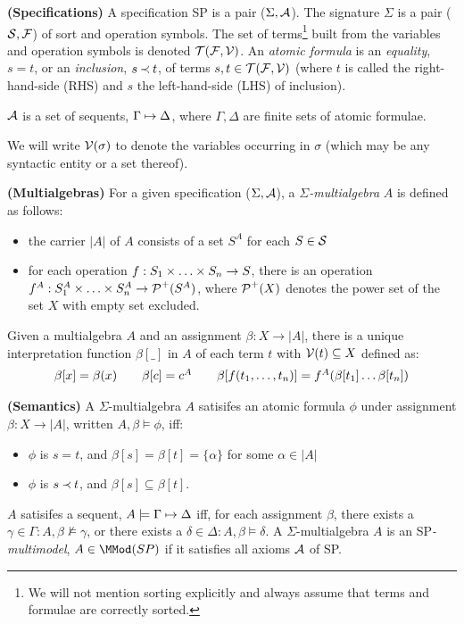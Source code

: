 \begin{DEFINITION} {\bf (Specifications)} \label{de:terms-vars-forms}
A specification SP is a pair ($\Sigma,\Ax$). The signature $\Sigma$ is a pair
($\Sorts,\Funcs$) of sort and operation symbols. 
The set of terms\footnote{We will not mention sorting explicitly
and always assume that terms and formulae are correctly sorted.}
 built from the variables and
operation symbols is denoted $\Terms{\Funcs,\C V}$. An {\em atomic formula} 
is an {\em equality}, $s=t$, or an {\em inclusion}, $s\Incl t$, of terms
$s,t\in\Terms{\Funcs,\Vars}$ (where $t$ is called the 
right-hand-side (RHS) and $s$ the left-hand-side (LHS) of inclusion).

 $\Ax$ is a set of sequents, $\Gamma\Seq\Delta$, where $\Gamma, \Delta$ are
finite sets of atomic formulae.
\end{DEFINITION}
\noindent
We will write $\C V(\sigma)$ to denote the variables occurring in $\sigma$ 
(which may be any syntactic entity or a set thereof).
%
\begin{DEFINITION} {\bf (Multialgebras)} \label{de:multialgebras}
For a given specification ($\Sigma,\Spec$), a {\em $\Sigma$-multialgebra} $A$
is defined as follows:
\begin{itemize}\MyLPar
\item  the carrier $|A|$ of $A$ consists of a set $S^A$ for each $S\in\Sorts$
\item for each operation $f: \List Sn\times \rightarrow S$, there is an operation
$f^A: \List {S^A}n\times \rightarrow \C P^+(S^A)$, where $\C P^+(X)$ denotes the 
power set of the set $X$ with empty set excluded.
\end{itemize}
\end{DEFINITION}
\noindent
Given a multialgebra $A$ and an assignment $\beta:X\rightarrow |A|$, there is a
unique interpretation function $\beta [\_]$ in $A$ of each term $t$ 
with $\C V(t)\subseteq X$ defined as:
\[ \begin{array}{ccccc} 
\beta [x] = \beta (x) & & \beta [c] = c^A
& & \beta [f(\List tn,)] = f^A(\beta[t_1]\ldots \beta[t_n]) 
\end{array} \]
%
\begin{DEFINITION} {\bf (Semantics)} \label{de:semantics}
A $\Sigma$-multialgebra $A$ satisifes an atomic formula $\phi$ under assignment
 $\beta:X\rightarrow |A|$, written $A,\beta\models \phi$, iff:
\begin{itemize}\MyLPar
\item $\phi$ is $s=t$, and $\beta[s]=\beta[t]=\{\alpha\}$ for some $\alpha\in |A|$
\item $\phi$ is $s\Incl t$, and $\beta[s]\subseteq\beta[t]$.
\end{itemize}
 $A$ satisifes a sequent, $A\models\Gamma\Seq\Delta$ iff,
for each assignment $\beta$, there exists a $\gamma\in\Gamma : A,\beta\not\models
\gamma$, or there exists a $\delta\in\Delta: A,\beta\models \delta$. 
A $\Sigma$-multialgebra $A$ is an SP{\em-multimodel}, $A\in \MMod(SP)$ if it satisfies 
all axioms $\Ax$ of SP.
\end{DEFINITION}
